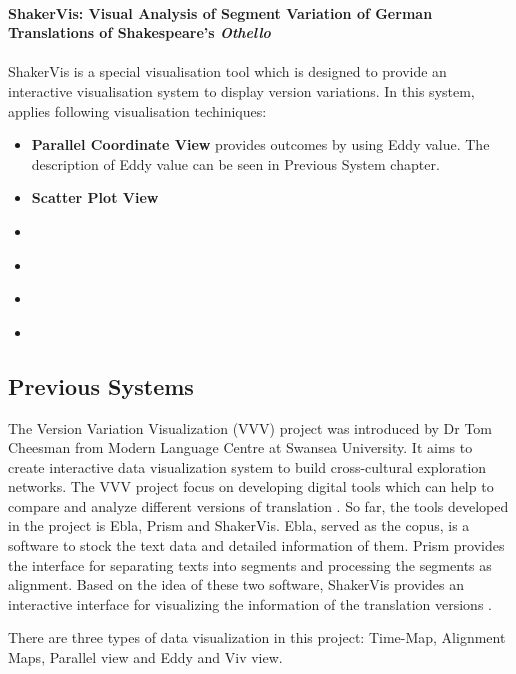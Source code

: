 \paragraph{ShakerVis: Visual Analysis of Segment Variation of German Translations of Shakespeare’s \emph{Othello}}
\paragraph[]{} ShakerVis \cite{Geng2015} is a special visualisation tool which is designed to provide an interactive visualisation system to display version variations. In this system, \cite{Geng2015} applies following visualisation techiniques:

\begin{itemize}
	\item \textbf{Parallel Coordinate View} provides outcomes by using Eddy value. The description of Eddy value can be seen in Previous System chapter.
	\item \textbf{Scatter Plot View} 
	\item \textbf{}
	\item \textbf{}
	\item \textbf{}
	\item \textbf{}
	
\end{itemize}

\subsection{Previous Systems}

The Version Variation Visualization (VVV) project was introduced by Dr Tom Cheesman from Modern Language Centre at Swansea University. It aims to create interactive data visualization system to build cross-cultural exploration networks. The VVV project focus on developing digital tools which can help to compare and analyze different versions of translation \cite{Cheesman2012}. So far, the tools developed in the project is Ebla, Prism and ShakerVis. Ebla, served as the copus, is a software to stock the text data and detailed information of them. Prism provides the interface for separating texts into segments and processing the segments as alignment. Based on the idea of these two software, ShakerVis provides an interactive interface for visualizing the information of the translation versions \cite{Geng2015}.

There are three types of data visualization in this project: Time-Map, Alignment Maps, Parallel view and Eddy and Viv view. 

